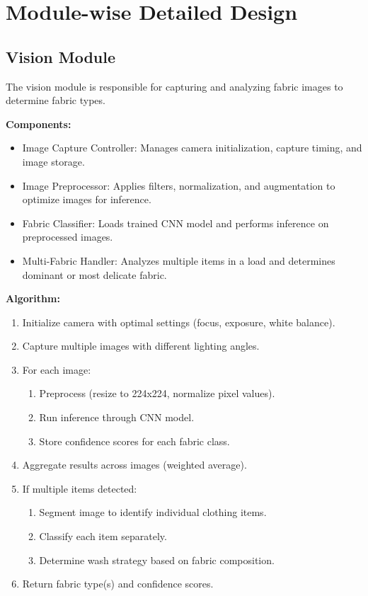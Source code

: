 \section{Module-wise Detailed Design}

\subsection{Vision Module}

The vision module is responsible for capturing and analyzing fabric images to determine fabric types.

\textbf{Components:}
\begin{itemize}
    \item Image Capture Controller: Manages camera initialization, capture timing, and image storage.
    \item Image Preprocessor: Applies filters, normalization, and augmentation to optimize images for inference.
    \item Fabric Classifier: Loads trained CNN model and performs inference on preprocessed images.
    \item Multi-Fabric Handler: Analyzes multiple items in a load and determines dominant or most delicate fabric.
\end{itemize}

\textbf{Algorithm:}
\begin{enumerate}
    \item Initialize camera with optimal settings (focus, exposure, white balance).
    \item Capture multiple images with different lighting angles.
    \item For each image:
        \begin{enumerate}
            \item Preprocess (resize to 224x224, normalize pixel values).
            \item Run inference through CNN model.
            \item Store confidence scores for each fabric class.
        \end{enumerate}
    \item Aggregate results across images (weighted average).
    \item If multiple items detected:
        \begin{enumerate}
            \item Segment image to identify individual clothing items.
            \item Classify each item separately.
            \item Determine wash strategy based on fabric composition.
        \end{enumerate}
    \item Return fabric type(s) and confidence scores.
\end{enumerate}

